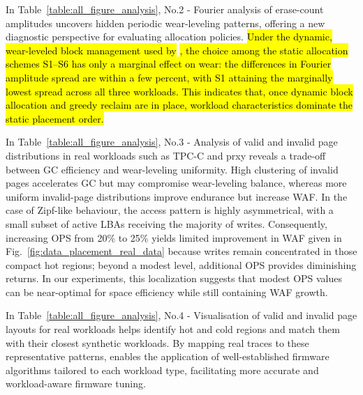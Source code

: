 \documentclass{ieeeaccess}
\begin{document}
In Table~\ref{table:all_figure_analysis}, No.2 - Fourier analysis of erase-count amplitudes uncovers hidden periodic wear-leveling patterns, offering a new diagnostic perspective for evaluating allocation policies. \hl{Under the dynamic, wear-leveled block management used by} \eyanassdsim\hl{, the choice among the static allocation schemes S1--S6 has only a marginal effect on wear: the differences in Fourier amplitude spread are within a few percent, with S1 attaining the marginally lowest spread across all three workloads. This indicates that, once dynamic block allocation and greedy reclaim are in place, workload characteristics dominate the static placement order.}

In Table~\ref{table:all_figure_analysis}, No.3 - Analysis of valid and invalid page distributions in real workloads such as TPC-C and prxy reveals a trade-off between GC efficiency and wear-leveling uniformity. High clustering of invalid pages accelerates GC but may compromise wear-leveling balance, whereas more uniform invalid-page distributions improve endurance but increase WAF. In the case of Zipf-like behaviour, the access pattern is highly asymmetrical, with a small subset of active LBAs receiving the majority of writes. Consequently, increasing OPS from 20\% to 25\% yields limited improvement in WAF given in Fig.~\ref{fig:data_placement_real_data} because writes remain concentrated in those compact hot regions; beyond a modest level, additional OPS provides diminishing returns. In our experiments, this localization suggests that modest OPS values can be near-optimal for space efficiency while still containing WAF growth.

In Table~\ref{table:all_figure_analysis}, No.4 - Visualisation of valid and invalid page layouts for real workloads helps identify hot and cold\cite{hot-cold} regions and match them with their closest synthetic workloads. By mapping real traces to these representative patterns, \eyanassdsim enables the application of well-established firmware algorithms tailored to each workload type, facilitating more accurate and workload-aware firmware tuning.
\end{document}
